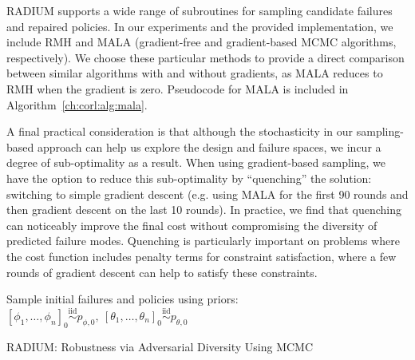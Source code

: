 RADIUM supports a wide range of subroutines for sampling candidate failures and repaired policies. In our experiments and the provided implementation, we include RMH and MALA (gradient-free and gradient-based MCMC algorithms, respectively). We choose these particular methods to provide a direct comparison between similar algorithms with and without gradients, as MALA reduces to RMH when the gradient is zero. Pseudocode for MALA is included in Algorithm~\ref{ch:corl:alg:mala}.

A final practical consideration is that although the stochasticity in our sampling-based approach can help us explore the design and failure spaces, we incur a degree of sub-optimality as a result. When using gradient-based sampling, we have the option to reduce this sub-optimality by ``quenching'' the solution: switching to simple gradient descent (e.g. using MALA for the first 90 rounds and then gradient descent on the last 10 rounds). In practice, we find that quenching can noticeably improve the final cost without compromising the diversity of predicted failure modes. Quenching is particularly important on problems where the cost function includes penalty terms for constraint satisfaction, where a few rounds of gradient descent can help to satisfy these constraints.

\begin{algorithm}
    \SetAlgoLined

    Sample initial failures and policies using priors: $[\phi_1, \ldots, \phi_n]_0 \overset{\mathrm{iid}}{\sim} p_{\phi, 0},\ [\theta_1, \ldots, \theta_n]_0 \overset{\mathrm{iid}}{\sim} p_{\theta, 0}$\;



    \caption{RADIUM: Robustness via Adversarial Diversity Using MCMC}\label{ch:corl:alg:adv_diffusion}
\end{algorithm}

